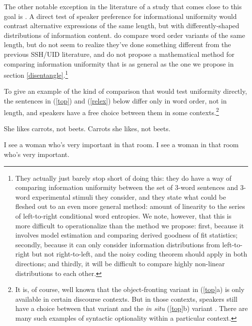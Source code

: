 \documentclass[12pt]{article}
\begin{document}
The other notable exception in the literature of a study that comes close to this goal is \citet{mauritsetal2010}. A direct test of speaker preference for informational uniformity would contrast alternative expressions of the same length, but with differently-shaped distributions of information content. \citet{mauritsetal2010} do compare word order variants of the same length, but do not seem to realize they've done something different from the previous SSH/UID literature, and do not propose a mathematical method for comparing information uniformity that is as general as the one we propose in section \ref{disentangle}.\footnote{They actually just barely stop short of doing this: they do have a way of comparing information uniformity between the set of 3-word sentences and 3-word experimental stimuli they consider, and they state what could be fleshed out to an even more general method: amount of linearity to the series of left-to-right conditional word entropies. We note, however, that this is more difficult to operationalize than the method we propose: first, because it involves model estimation and comparing derived goodness of fit statistics; secondly, because it can only consider information distributions from left-to-right but not right-to-left, and the noisy coding theorem should apply in both directions; and thirdly, it will be difficult to compare highly non-linear distributions to each other.} 

To give an example of the kind of comparison that would test uniformity directly, the sentences in (\ref{top}) and (\ref{relex}) below differ only in word order, not in length, and speakers have a free choice between them in some contexts.\footnote{It is, of course, well known that the object-fronting variant in (\ref{top}a) is only available in certain discourse contexts. But in those contexts, speakers still have a choice between that variant and the \textsl{in situ} (\ref{top}b) variant \citep{prince1998, prince1999}. There are many such examples of syntactic optionality within a particular context.} 

\begin{exe}
	\ex \label{top} \begin{xlist} \ex She likes carrots, not beets.
		\ex Carrots she likes, not beets.
		\end{xlist}
	\ex \label{relex} \begin{xlist}
		\ex I see a woman who's very important in that room.
		\ex I see a woman in that room who's very important.
	\end{xlist}
\end{exe}
\end{document}
